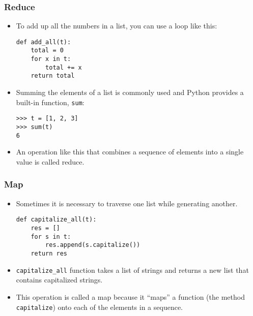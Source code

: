 \documentclass{beamer}
\newcommand{\beforeverb}{\footnotesize}
\newcommand{\afterverb}{\normalsize}
\begin{document}
\begin{frame}[fragile]
\frametitle{Reduce}
\begin{itemize}
\item To add up all the numbers in a list, you can use a loop like this:
\beforeverb
\begin{verbatim}
def add_all(t):
    total = 0
    for x in t:
        total += x
    return total
\end{verbatim}
\afterverb
\item Summing the elements of a list is commonly used and Python provides a built-in function, {\tt sum}:

\beforeverb
\begin{verbatim}
>>> t = [1, 2, 3]
>>> sum(t)
6
\end{verbatim}
\afterverb

\item An operation like this that combines a sequence of elements into
a single value is called \alert{ reduce}.
\end{itemize}
\end{frame}
\begin{frame}[fragile]
\frametitle{Map}
\begin{itemize}
\item Sometimes it is necessary to traverse one list while generating
another.
\beforeverb
\begin{verbatim}
def capitalize_all(t):
    res = []
    for s in t:
        res.append(s.capitalize())
    return res
\end{verbatim}
\afterverb
\item \verb!capitalize_all! function takes a list of strings
and returns a new list that contains capitalized strings.
\item This operation is called a \alert{map} because it ``maps'' a function (the method {\tt
capitalize}) onto each of the elements in a sequence.
\end{itemize}

\end{frame}
\end{document}
